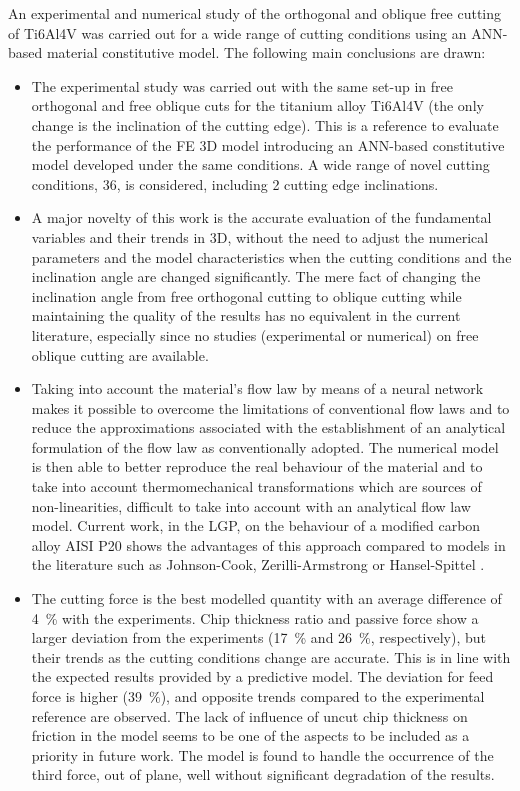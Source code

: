 \documentclass[preprint,12pt,times]{elsarticle}
\begin{document}
An experimental and numerical study of the orthogonal and oblique free cutting of Ti6Al4V was carried out for a wide range of cutting conditions using an ANN-based material constitutive model. The following main conclusions are drawn:
\begin{itemize}
  \item The experimental study was carried out with the same set-up in free orthogonal and free oblique cuts for the titanium alloy Ti6Al4V (the only change is the inclination of the cutting edge). This is a reference to evaluate the performance of the FE 3D model introducing an ANN-based constitutive model developed under the same conditions. A wide range of novel cutting conditions, 36, is considered, including 2 cutting edge inclinations.
  \item A major novelty of this work is the accurate evaluation of the fundamental variables and their trends in 3D, without the need to adjust the numerical parameters and the model characteristics when the cutting conditions and the inclination angle are changed significantly. The mere fact of changing the inclination angle from free orthogonal cutting to oblique cutting while maintaining the quality of the results has no equivalent in the current literature, especially since no studies (experimental or numerical) on free oblique cutting are available.
  \item Taking into account the material's flow law by means of a neural network makes it possible to overcome the limitations of conventional flow laws and to reduce the approximations associated with the establishment of an analytical formulation of the flow law as conventionally adopted. The numerical model is then able to better reproduce the real behaviour of the material and to take into account thermomechanical transformations which are sources of non-linearities, difficult to take into account with an analytical flow law model. Current work, in the LGP, on the behaviour of a modified carbon alloy AISI P20 shows the advantages of this approach compared to models in the literature such as Johnson-Cook, Zerilli-Armstrong \cite{Muralli-2017-Performance} or Hansel-Spittel \cite{chadha2018approach}.
  \item The cutting force is the best modelled quantity with an average difference of \qty{4}{\%} with the experiments. Chip thickness ratio and passive force show a larger deviation from the experiments (\qty{17}{\%} and \qty{26}{\%}, respectively), but their trends as the cutting conditions change are accurate. This is in line with the expected results provided by a predictive model. The deviation for feed force is higher (\qty{39}{\%}), and opposite trends compared to the experimental reference are observed. The lack of influence of uncut chip thickness on friction in the model seems to be one of the aspects to be included as a priority in future work. The model is found to handle the occurrence of the third force, out of plane, well without significant degradation of the results.

\end{itemize}
\end{document}
